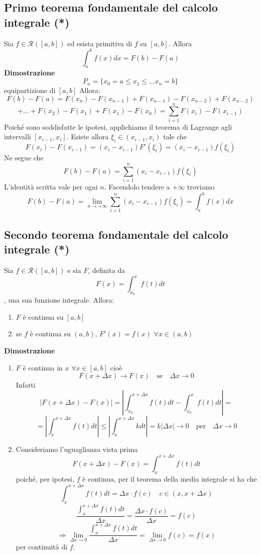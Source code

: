 \documentclass[12pt]{article}
\begin{document}
\subsection{Primo teorema fondamentale del calcolo integrale (*)}
Sia $f \in \mathscr{R} ([a,b])$ ed esista primitiva di $f$ su $[a,b]$. Allora 
\[\int_{a}^{b} f(x) dx = F(b) - F(a)\]
\textbf{Dimostrazione}
\[ P_n = \{ x_0 = a \leq x_1 \leq \dots x_n = b \} \] equipartizione di $[a,b]$ Allora:
\[ F(b) - F(a) = F(x_n) - F(x_{n-1}) + F(x_{n-1}) - F(x_{n-2}) + F(x_{n-2})\]
\[+ \dots + F(x_2) - F(x_1) + F(x_1) - F(x_0) = \sum_{i = 1}^{n} F(x_i) - F(x_{i-1})\]
Poiché sono soddisfatte le ipotesi, applichiamo il teorema di Lagrange agli intervalli $[x_{i-1}, x_i]$. Esiste allora $\xi_i \in (x_{i-1}, x_i)$ tale che
\[ F(x_i) - F(x_{i-1}) = (x_i - x_{i-1})F'(\xi_i) = (x_i - x_{i-1})f(\xi_i)\]
Ne segue che
\[F(b) - F(a) = \sum_{i = 1}^{n} (x_i - x_{i-1})f(\xi_i) \]
L'identità scritta vale per ogni $n$. Facendolo tendere a $+\infty$ troviamo
\[\displaystyle F(b) - F(a) = \lim_{n \to +\infty} \sum_{i = 1}^{n} (x_i - x_{i-1})f(\xi_i) = \int_{a}^{b} f(x) dx\]

\subsection{Secondo teorema fondamentale del calcolo integrale (*)}
Sia $f \in \mathscr{R}([a,b])$ e sia $F$, definita da 
\[F(x) = \int_{x_0}^x f(t) dt\]
, una sua funzione integrale. Allora:
\begin{enumerate}
  \item $F$ è continua su $[a,b]$
  \item se $f$ è continua su $(a,b)$, $F'(x) = f(x)$ $\forall x \in (a,b)$
\end{enumerate}
\textbf{Dimostrazione}
\begin{enumerate}
    \item 
    $F$ è continua in $x$ $\forall x \in [a,b]$ cioè
\[F(x + \Delta x) \to F(x) \quad \text{se} \quad \Delta x \to 0\] Infatti
\[|F(x + \Delta x) - F(x)| = |\int_{x_0}^{x + \Delta x} f(t) dt - \int_{x_0}^{x} f(t) dt| = \]
\[ = |\int_{x}^{x+\Delta x} f(t) dt| \leq |\int_{x}^{x+\Delta x} k dt| = k|\Delta x| \to 0 \quad \text{per} \quad \Delta x \to 0\]
    \item
    Consideriamo l'uguaglianza vista prima
\[F(x + \Delta x) - F(x) = \int_{x}^{x+\Delta x} f(t) dt\]
poiché, per ipotesi, $f$ è continua, per il teorema della media integrale si ha che
\[ \int_{x}^{x+\Delta x} f(t) dt = \Delta x \cdot f(c) \quad c \in (x, x+\Delta x)\]
\[\frac{\int_{x}^{x+\Delta x} f(t) dt}{\Delta x} = \frac{\Delta x \cdot f(c)}{\Delta x} = f(c)\]
\[ \Rightarrow \lim_{\Delta x \to 0} \frac{\int_{x}^{x+\Delta x} f(t) dt}{\Delta x} = \lim_{\Delta x \to 0} f(c) = f(x) \]
per continuità di $f$.
\end{enumerate}
\end{document}
